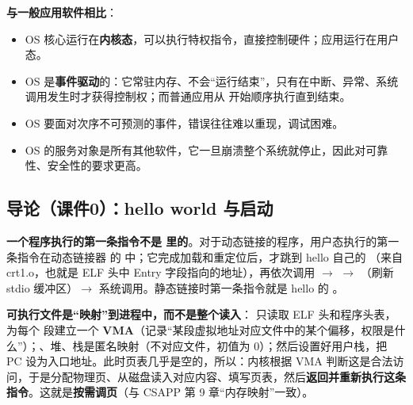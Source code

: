 \textbf{与一般应用软件相比}：
\begin{itemize}
    \item OS 核心运行在\textbf{内核态}，可以执行特权指令，直接控制硬件；应用运行在用户态。
    \item OS 是\textbf{事件驱动}的：它常驻内存、不会“运行结束”，只有在中断、异常、系统调用发生时才获得控制权；而普通应用从  开始顺序执行直到结束。
    \item OS 要面对次序不可预测的事件，错误往往难以重现，调试困难。
    \item OS 的服务对象是所有其他软件，它一旦崩溃整个系统就停止，因此对可靠性、安全性的要求更高。
\end{itemize}

\subsection{导论（课件0）：hello world 与启动}

\textbf{一个程序执行的第一条指令不是  里的}。对于动态链接的程序，用户态执行的第一条指令在动态链接器  的  中；它完成加载和重定位后，才跳到 hello 自己的 （来自 crt1.o，也就是 ELF 头中 Entry 字段指向的地址），再依次调用  $\to$  $\to$ （刷新 stdio 缓冲区）$\to$  系统调用。静态链接时第一条指令就是 hello 的 。

\textbf{可执行文件是“映射”到进程中，而不是整个读入}： 只读取 ELF 头和程序头表，为每个  段建立一个 \textbf{VMA}（记录“某段虚拟地址对应文件中的某个偏移，权限是什么”）；、堆、栈是匿名映射（不对应文件，初值为 0）；然后设置好用户栈，把 PC 设为入口地址。此时页表几乎是空的，所以：内核根据 VMA 判断这是合法访问，于是分配物理页、从磁盘读入对应内容、填写页表，然后\textbf{返回并重新执行这条指令}。这就是\textbf{按需调页}（与 CSAPP 第 9 章“内存映射”一致）。

